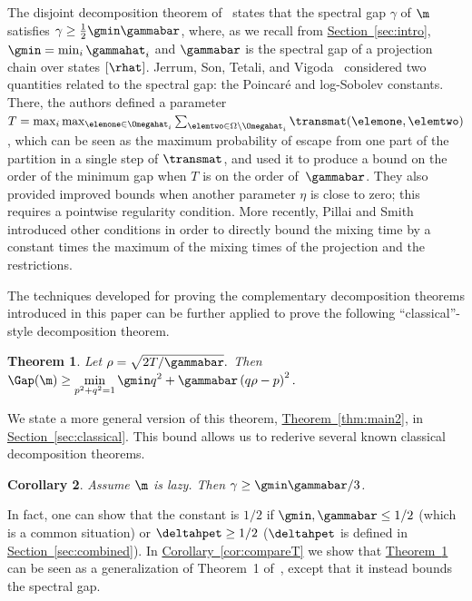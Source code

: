 \documentclass[11pt]{article}
\newtheorem{theorem}{Theorem}[section]
\newtheorem{corollary}[theorem]{Corollary}
\providecommand{\expref}[2]{\texorpdfstring{\hyperref[#2]{#1~\ref{#2}}}{#1~\ref{#2}}}
\begin{document}
The disjoint decomposition theorem of~\cite{MR00} states that the 
spectral gap $\gamma$ of $\m$ satisfies $\gamma \geq 
\frac{1}{2}\gmin\gammabar$, where, as we recall from 
\expref{Section}{sec:intro}, $\gmin=\min_i \gammahat_i$ and $\gammabar$ is 
the spectral gap of a projection chain over states $[\rhat]$. Jerrum, 
Son, Tetali, and Vigoda~\cite{jstv04} considered two quantities related 
to the spectral gap: the Poincar\'{e} and log-Sobolev constants.  
There, the authors defined a parameter 
$T=\max_i\max_{\elemone\in\Omegahat_i}\sum_{\elemtwo\in 
\Omega\setminus\Omegahat_i}\transmat(\elemone,\elemtwo)$, which can be 
seen as the maximum probability of escape from one part of the 
partition in a single step of $\transmat$, and used it to produce a 
bound on the order of the minimum gap
when $T$ is on the order of~$\gammabar$.  They also provided 
improved bounds when another parameter $\eta$ is close to zero; this 
requires a pointwise regularity condition. More recently, Pillai and 
Smith~\cite{PS17} introduced other conditions in order to directly 
bound the mixing time by a constant times the maximum of the mixing 
times of the projection and the restrictions.

The techniques developed for proving the complementary decomposition 
theorems introduced in this paper can be further applied to prove the 
following ``classical''-style decomposition theorem.

\begin{theorem}\label{thm:main}
  Let $\rho=\sqrt{2T/\gammabar}.$ Then   $\Gap(\m)\geq \displaystyle\min_{p^2+q^2=1}
\gmin q^2+\gammabar\left(q\rho - p\right)^2.$
%
\end{theorem}
\noindent
 We state a more general version of this theorem, \expref{Theorem}{thm:main2}, in
\expref{Section}{sec:classical}.
This bound allows us to rederive several known classical
decomposition theorems.

\begin{corollary}\label{cor:compareproduct}
  Assume $\m$ is lazy.  Then $\gamma\geq \gmin\gammabar/3$.
\end{corollary}
\noindent In fact, one can show that the constant is $1/2$ if $\gmin,\gammabar\leq 1/2$ (which is a common situation) or $\deltahpet\geq 1/2$ ($\deltahpet$ is defined in \expref{Section}{sec:combined}).
In \expref{Corollary}{cor:compareT} we show that \expref{Theorem}{thm:main}
can be seen as a generalization of Theorem~1 of~\cite{jstv04}, except
that it instead bounds the spectral gap.
\end{document}
